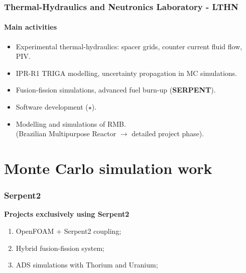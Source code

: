 \documentclass[svgnames,smaller,table,draft]{beamer}
\begin{document}
\begin{frame}
  \frametitle{Thermal-Hydraulics and Neutronics Laboratory - LTHN}
  \framesubtitle{Main activities}
  \begin{center}
    \begin{itemize}
    \item Experimental thermal-hydraulics: spacer grids, counter current fluid flow, PIV.
    \item IPR-R1 TRIGA modelling, uncertainty propagation in MC simulations.
    \item Fusion-fission simulations, advanced fuel burn-up (\textbf{SERPENT}).
    \item Software development ($\star$).
    \item Modelling and simulations of RMB.\\ (Brazilian Multipurpose Reactor $\rightarrow$ detailed project phase).
    \end{itemize}
  \end{center}
\end{frame}

\section{Monte Carlo simulation work}
\begin{frame}
  \frametitle{Serpent2}
  \textbf{Projects exclusively using Serpent2}
  \vspace{10px}
  \begin{enumerate}
    \item OpenFOAM + Serpent2 coupling;
    \item Hybrid fusion-fission system;
    \item ADS simulations with Thorium and Uranium;
    \end{enumerate}
\end{frame}
\end{document}
